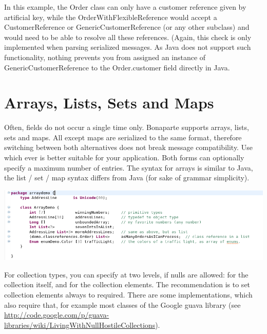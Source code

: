 \documentclass[11pt,a4paper,oneside]{article}
\begin{document}
\noindent In this example, the {\ttfamily Order} class can only have a customer reference given by artificial key, while the {\ttfamily OrderWithFlexibleReference}
would accept a {\ttfamily CustomerReference} or {\ttfamily GenericCustomerReference} (or any other subclass) and would need to be able to resolve all these
references. (Again, this check is only implemented when parsing serialized messages. As Java does not support such functionality, nothing prevents you
from assigned an instance of {\ttfamily GenericCustomerReference}  to the {\ttfamily Order.customer} field directly in Java.



\section{Arrays, Lists, Sets and Maps}
Often, fields do not occur a single time only. Bonaparte supports arrays, lists, sets and maps. All except maps are
serialized to the same format, therefore switching between both alternatives does not break message compatibility.
Use which ever is better suitable for your application.
Both forms can optionally specify a maximum number of entries.
The syntax for arrays is similar to Java, the list / set / map syntax differs from Java (for sake of grammar simplicity).

\vspace{2mm}

\hspace{1cm}\includegraphics[scale=0.5]{images/tut1-015-arrays.png}

For collection types, you can specify at two levels, if {\ttfamily null}s are allowed: for the collection itself, and for the
collection elements.  The recommendation is to set collection elements always to {\ttfamily required}. There are some
implementations, which also require that, for example most classes of the Google {\ttfamily guava} library (see
\url{http://code.google.com/p/guava-libraries/wiki/LivingWithNullHostileCollections}).

\vspace{2mm}
\end{document}
